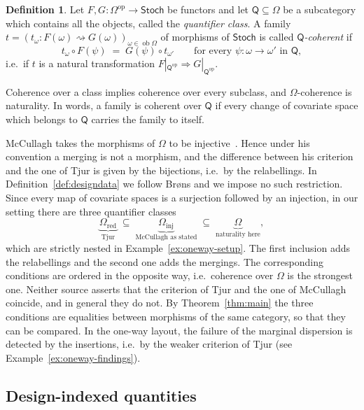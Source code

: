 \documentclass[11pt,a4paper]{article}
\theoremstyle{plain}
\theoremstyle{definition}
\newtheorem{definition}[theorem]{Definition}
\theoremstyle{remark}
\newcommand{\cat}[1]{\mathsf{#1}}
\newcommand{\catO}{\cat{\Omega}}
\newcommand{\Stoch}{\cat{Stoch}}
\newcommand{\op}{\mathrm{op}}
\DeclareMathOperator{\ob}{ob}
\begin{document}
\begin{definition}\label{def:coherence}
Let $F, G \colon \catO^{\op} \to \Stoch$ be functors and let
$\cat{Q} \subseteq \catO$ be a subcategory which contains all the objects,
called the \emph{quantifier class}. A family
$t = (t_{\omega} \colon F(\omega) \rightsquigarrow G(\omega))_{\omega \in \ob\catO}$
of morphisms of $\Stoch$ is called \emph{$\cat{Q}$-coherent} if
\begin{equation}\label{eq:coherence}
t_{\omega} \circ F(\psi) \;=\; G(\psi) \circ t_{\omega'}
\qquad\text{for every } \psi \colon \omega \to \omega' \text{ in } \cat{Q},
\end{equation}
i.e.\ if $t$ is a natural transformation
$F|_{\cat{Q}^{\op}} \Rightarrow G|_{\cat{Q}^{\op}}$.
\end{definition}

Coherence over a class implies coherence over every subclass, and
$\catO$-coherence is naturality. In words, a family is coherent over $\cat{Q}$
if every change of covariate space which belongs to $\cat{Q}$ carries the
family to itself.

McCullagh takes the morphisms of $\catO$ to be
injective~\cite[\S4.1]{mccullagh_what_2002}. Hence under his convention a
merging is not a morphism, and the difference between his criterion and the
one of Tjur is given by the bijections, i.e.\ by the relabellings. In
Definition~\ref{def:designdata} we follow Br\o ns and we impose no such
restriction. Since every map of covariate spaces is a surjection followed by
an injection, in our setting there are three quantifier classes
\[
\underbrace{\catO_{\mathrm{red}}}_{\text{Tjur}}
\;\subseteq\;
\underbrace{\catO_{\mathrm{inj}}}_{\text{McCullagh as stated}}
\;\subseteq\;
\underbrace{\catO}_{\text{naturality here}},
\]
which are strictly nested in Example~\ref{ex:oneway-setup}. The first
inclusion adds the relabellings and the second one adds the mergings. The
corresponding conditions are ordered in the opposite way, i.e.\ coherence over
$\catO$ is the strongest one. Neither source asserts that the criterion of
Tjur and the one of McCullagh coincide, and in general they do not. By
Theorem~\ref{thm:main} the three conditions are equalities between morphisms
of the same category, so that they can be compared. In the one-way layout, the
failure of the marginal dispersion is detected by the insertions, i.e.\ by the
weaker criterion of Tjur (see Example~\ref{ex:oneway-findings}).

\subsection{Design-indexed quantities}
\end{document}
